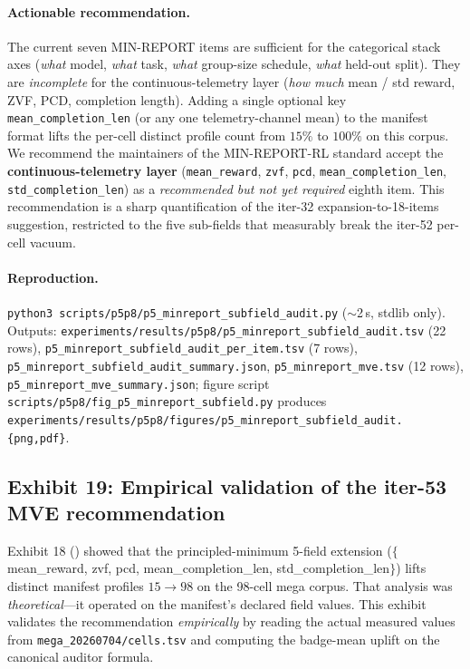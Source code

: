\paragraph{Actionable recommendation.}
The current seven MIN-REPORT items are sufficient for the categorical
stack axes (\textit{what} model, \textit{what} task, \textit{what}
group-size schedule, \textit{what} held-out split). They are
\emph{incomplete} for the continuous-telemetry layer (\textit{how
much} mean / std reward, ZVF, PCD, completion length). Adding a
single optional key \texttt{mean\_completion\_len} (or any one
telemetry-channel mean) to the manifest format lifts the per-cell
distinct profile count from $15\%$ to $100\%$ on this corpus. We
recommend the maintainers of the MIN-REPORT-RL standard accept the
\textbf{continuous-telemetry layer} (\texttt{mean\_reward},
\texttt{zvf}, \texttt{pcd}, \texttt{mean\_completion\_len},
\texttt{std\_completion\_len}) as a \emph{recommended but not yet
required} eighth item. This recommendation is a sharp quantification
of the iter-32 expansion-to-18-items suggestion, restricted to the
five sub-fields that measurably break the iter-52 per-cell vacuum.

\paragraph{Reproduction.}
\texttt{python3 scripts/p5p8/p5\_minreport\_subfield\_audit.py}
($\sim$2\,s, stdlib only). Outputs:
\texttt{experiments/results/p5p8/p5\_minreport\_subfield\_audit.tsv}
(22 rows), \texttt{p5\_minreport\_subfield\_audit\_per\_item.tsv}
(7 rows),
\texttt{p5\_minreport\_subfield\_audit\_summary.json},
\texttt{p5\_minreport\_mve.tsv} (12 rows),
\texttt{p5\_minreport\_mve\_summary.json};
figure script
\texttt{scripts/p5p8/fig\_p5\_minreport\_subfield.py} produces
\texttt{experiments/results/p5p8/figures/p5\_minreport\_subfield\_audit.\{png,pdf\}}.

\subsection{Exhibit 19: Empirical validation of the iter-53 MVE recommendation}
\label{sec:p5-mve-empirical}

Exhibit 18 () showed that the
principled-minimum 5-field extension
($\{$mean\_reward, zvf, pcd, mean\_completion\_len,
std\_completion\_len$\}$) lifts distinct manifest profiles
$15 \rightarrow 98$ on the 98-cell mega corpus. That analysis was
\emph{theoretical}---it operated on the manifest's declared field
values. This exhibit validates the recommendation \emph{empirically}
by reading the actual measured values from
\texttt{mega\_20260704/cells.tsv} and computing the badge-mean uplift
on the canonical auditor formula.

